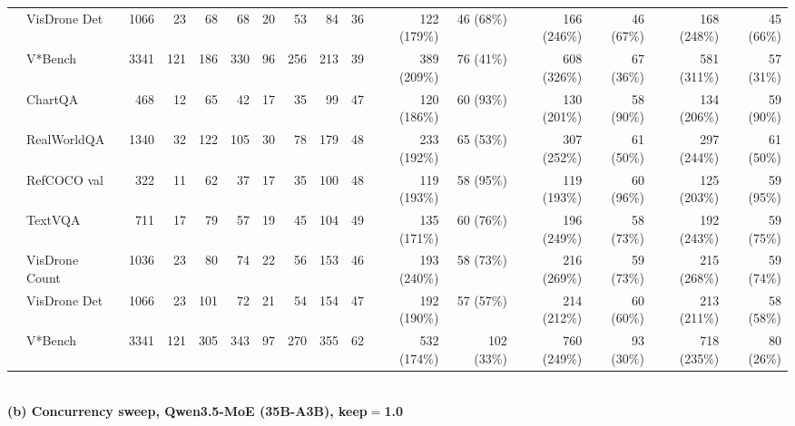 \begin{table}[t]
\begin{center}
\begin{small}
\begin{sc}
{\begin{tabular}{llrrrrrrrrrrrrrr}
& VisDrone Det & 1066 & 23 & 68 & 68 & 20 & 53 & 84 & 36 & 122 (179\%) & 46 (68\%) & 166 (246\%) & 46 (67\%) & 168 (248\%) & 45 (66\%) \\
& V*Bench & 3341 & 121 & 186 & 330 & 96 & 256 & 213 & 39 & 389 (209\%) & 76 (41\%) & 608 (326\%) & 67 (36\%) & 581 (311\%) & 57 (31\%) \\
\midrule
{}
& ChartQA & 468 & 12 & 65 & 42 & 17 & 35 & 99 & 47 & 120 (186\%) & 60 (93\%) & 130 (201\%) & 58 (90\%) & 134 (206\%) & 59 (90\%) \\
& RealWorldQA & 1340 & 32 & 122 & 105 & 30 & 78 & 179 & 48 & 233 (192\%) & 65 (53\%) & 307 (252\%) & 61 (50\%) & 297 (244\%) & 61 (50\%) \\
& RefCOCO val & 322 & 11 & 62 & 37 & 17 & 35 & 100 & 48 & 119 (193\%) & 58 (95\%) & 119 (193\%) & 60 (96\%) & 125 (203\%) & 59 (95\%) \\
& TextVQA & 711 & 17 & 79 & 57 & 19 & 45 & 104 & 49 & 135 (171\%) & 60 (76\%) & 196 (249\%) & 58 (73\%) & 192 (243\%) & 59 (75\%) \\
& VisDrone Count & 1036 & 23 & 80 & 74 & 22 & 56 & 153 & 46 & 193 (240\%) & 58 (73\%) & 216 (269\%) & 59 (73\%) & 215 (268\%) & 59 (74\%) \\
& VisDrone Det & 1066 & 23 & 101 & 72 & 21 & 54 & 154 & 47 & 192 (190\%) & 57 (57\%) & 214 (212\%) & 60 (60\%) & 213 (211\%) & 58 (58\%) \\
& V*Bench & 3341 & 121 & 305 & 343 & 97 & 270 & 355 & 62 & 532 (174\%) & 102 (33\%) & 760 (249\%) & 93 (30\%) & 718 (235\%) & 80 (26\%) \\
\bottomrule
\end{tabular}}
\\[6pt]
\textbf{(b) Concurrency sweep, Qwen3.5-MoE (35B-A3B), keep$=$1.0}\\[2pt]
\end{sc}
\end{small}
\end{center}
\end{table}

